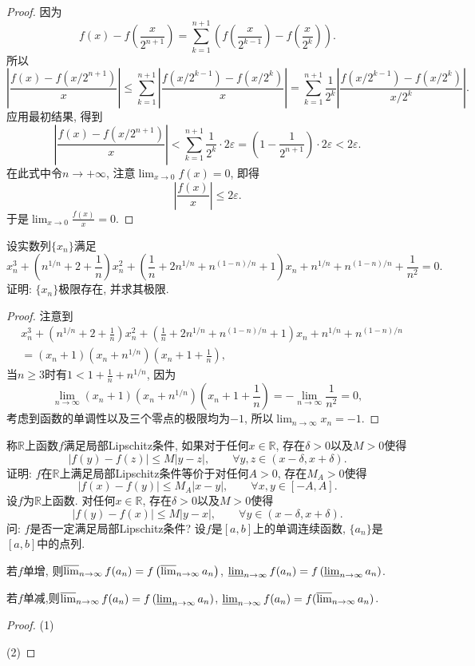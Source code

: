 \begin{quiza}
\begin{proof}
因为\[f(x)-f\left(\frac{x}{2^{n+1}}\right)=\sum_{k=1}^{n+1}\left(f\left(\frac{x}{2^{k-1}}\right)-f\left(\frac{x}{2^k}\right)\right).\]
所以\[\left|\frac{f(x)-f\left(x/2^{n+1}\right)}{x}\right|\leqslant\sum_{k=1}^{n+1}\left|\frac{f\left(x/2^{k-1}\right)-f\left(x/2^k\right)}{x}\right|=\sum_{k=1}^{n+1}\frac{1}{2^k}\left|\frac{f\left(x/2^{k-1}\right)-f\left(x/2^k\right)}{x/2^k}\right|.\]应用最初结果, 得到\[\left|\frac{f(x)-f\left(x/2^{n+1}\right)}{x}\right|<\sum_{k=1}^{n+1}\frac{1}{2^k}\cdot 2\varepsilon=\left(1-\frac{1}{2^{n+1}}\right)\cdot2\varepsilon<2\varepsilon.\]在此式中令\(n\rightarrow +\infty\), 注意\(\lim_{x\rightarrow 0}f(x)=0\), 即得\[\left|\frac{f(x)}{x}\right|\leqslant 2\varepsilon.\]于是\(\lim_{x\rightarrow 0}\frac{f(x)}{x}=0.\)
\end{proof}
\woe  设实数列\(\{x_n\}\)满足\[x_n^3+\left(n^{1/n}+2+\frac{1}{n}\right)x_n^2+\left(\frac{1}{n}+2n^{1/n}+n^{(1-n)/n}+1\right)x_n+n^{1/n}+n^{(1-n)/n}+\frac{1}{n^2}=0.\]证明: \(\{x_n\}\)极限存在, 并求其极限.
\begin{proof}
注意到\[\begin{split}
&x_n^3+\left(n^{1/n}+2+\frac{1}{n}\right)x_n^2+\left(\frac{1}{n}+2n^{1/n}+n^{(1-n)/n}+1\right)x_n+n^{1/n}+n^{(1-n)/n}\\&=(x_n+1)(x_n+n^{1/n})(x_n+1+\frac{1}{n}),
\end{split}\]当\(n\geqslant 3\)时有\(1<1+\frac{1}{n}+n^{1/n}\), 因为\[\lim_{n\rightarrow\infty}(x_n+1)(x_n+n^{1/n})(x_n+1+\frac{1}{n})=-\lim_{n\rightarrow\infty}\frac{1}{n^2}=0,\]考虑到函数的单调性以及三个零点的极限均为\(-1\), 所以\(\lim_{n\rightarrow\infty}x_n=-1.\)
\end{proof}
\woe 称\(\mathbb{R}\)上函数\(f\)满足局部Lipschitz条件, 如果对于任何\(x\in\mathbb{R}\), 存在\(\delta>0\)以及\(M>0\)使得\[|f(y)-f(z)|\leqslant M|y-z|,\qquad\forall y,z\in(x-\delta,x+\delta).\]证明: \(f\)在\(\mathbb{R}\)上满足局部Lipschitz条件等价于对任何\(A>0\), 存在\(M_A>0\)使得\[|f(x)-f(y)|\leqslant M_A|x-y|,\qquad \forall x,y\in[-A,A].\]
\woe 设\(f\)为\(\mathbb{R}\)上函数. 对任何\(x\in\mathbb{R}\), 存在\(\delta>0\)以及\(M>0\)使得\[|f(y)-f(x)|\leqslant M|y-x|,\qquad\forall y\in (x-\delta,x+\delta).\]问: \(f\)是否一定满足局部Lipschitz条件?
\woe 设\(f\)是\([a,b]\)上的单调连续函数, \(\{a_n\}\)是\([a,b]\)中的点列.
\begin{quizs}
    \item 若\(f\)单增, 则\(\varlimsup_{n\rightarrow\infty}f(a_n)=f\left(\varlimsup_{n\rightarrow\infty}a_n\right)\), \(\varliminf_{n\rightarrow\infty}f(a_n)=f\left(\varliminf_{n\rightarrow\infty}a_n\right)\).
    \item 若\(f\)单减,则\(\varlimsup_{n\rightarrow\infty}f(a_n)=f\left(\varliminf_{n\rightarrow\infty}a_n\right)\), \(\varliminf_{n\rightarrow\infty}f(a_n)=f(\varlimsup_{n\rightarrow\infty}a_n)\).
\end{quizs}
\begin{proof}
	(1)
	
	(2)
\end{proof}
\end{quiza}
